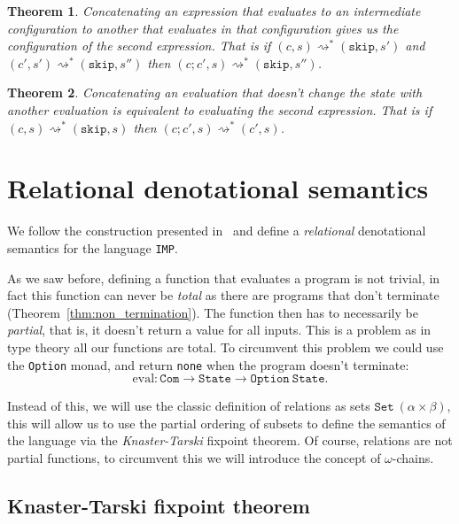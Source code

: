 \documentclass[
  a4paper, 
  10pt, 
  parskip=half, 
  DIV=20,
  toc=bibliography,
  usegeometry,
]{scrartcl}
\newtheorem{theorem}{Theorem}[section]
\newcommand{\funfont}[1]{\text{#1}}
\newcommand{\tyfont}[1]{\texttt{#1}}
\begin{document}
\begin{theorem}
  Concatenating an expression that evaluates to an intermediate configuration to
  another that evaluates in that configuration gives us the configuration of the
  second expression. That is if \((c, s) \rightsquigarrow^* (\texttt{skip}, s')\)
  and \((c', s') \rightsquigarrow^* (\texttt{skip}, s'')\) then
  \((c;c', s) \rightsquigarrow^* (\texttt{skip}, s'')\).
\end{theorem}

\begin{theorem}
  Concatenating an evaluation that doesn't change the state with another
  evaluation is equivalent to evaluating the second expression. That is
  if \((c, s) \rightsquigarrow^* (\texttt{skip}, s)\) then
  \((c;c', s) \rightsquigarrow^* (c', s)\).
\end{theorem}

\section{Relational denotational semantics}

We follow the construction presented  in~\cite[Chapter~11]{semantics_with_isabelle} 
and define a \emph{relational} denotational semantics for the language \texttt{IMP}.

As we saw before, defining a function that evaluates a program is not trivial,
in fact this function can never be \emph{total} as there are programs that don't
terminate (Theorem~\ref{thm:non_termination}). The function then
has to necessarily be \emph{partial}, that is, it doesn't return a value for
all inputs. This is a problem as in type theory all our functions are
total. To circumvent this problem we could use the \texttt{Option} monad,
and return \texttt{none} when the program doesn't terminate:
\[
  \funfont{eval} : \tyfont{Com} \to \tyfont{State} \to \tyfont{Option} \ \tyfont{State}.
\]

Instead of this, we will use the classic definition of relations as sets
\(\tyfont{Set} \ (\alpha \times \beta)\), this will allow us to use the 
partial ordering of subsets to define the semantics of the language via
the \emph{Knaster-Tarski} fixpoint theorem. Of course, relations are not 
partial functions, to circumvent this we will introduce the concept
of \(\omega\)-chains.

\subsection{Knaster-Tarski fixpoint theorem}
\end{document}
